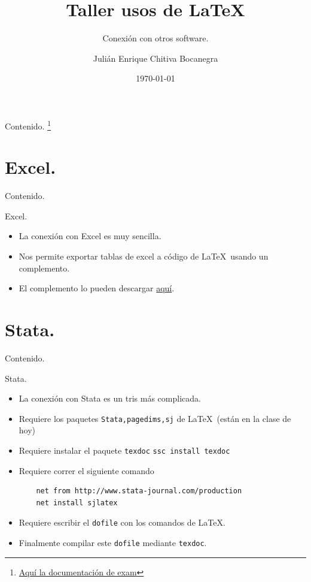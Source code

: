 \documentclass[dvipsnames,xcolor=x11names]{beamer}
\title{Taller usos de \LaTeX}
\subtitle{Conexión con otros software.}
\author[Julián Chitiva Bocanegra]{Julián Enrique Chitiva Bocanegra}
\institute[Uniandes] 
{Universidad de los Andes\\ Facultad de Economía}
\date{\today}
\theoremstyle{plain}
\theoremstyle{definition}
\begin{document}
\begin{frame}
  \titlepage
\end{frame}

\begin{frame}{Contenido.}
  \tableofcontents\footnote{\href{http://www-math.mit.edu/~psh/exam/examdoc.pdf}{Aquí la documentación de exam}}
\end{frame}

\section{Excel.}
\begin{frame}{Contenido.}
  \tableofcontents[currentsection]
\end{frame}
\begin{frame}{Excel.}
\begin{itemize}[<+->]
    \item La conexión con Excel es muy sencilla.
    \item Nos permite exportar tablas de excel a código de \LaTeX\ usando un complemento.
    \item El complemento lo pueden descargar \href{https://ctan.org/pkg/excel2latex?lang=en}{\textcolor{colorClase}{aquí}}.
\end{itemize}
    
\end{frame}
\section{Stata.}
\begin{frame}{Contenido.}
  \tableofcontents[currentsection]
\end{frame}
\begin{frame}[fragile]{Stata.}
    \begin{itemize}[<+->]
        \item La conexión con Stata es un tris más complicada. 
        \item Requiere los paquetes \texttt{Stata,pagedims,sj} de \LaTeX\ (están en la clase de hoy)
        \item Requiere instalar el paquete \texttt{texdoc} \verb!ssc install texdoc!
        \item Requiere correr el siguiente comando 
    \begin{verbatim}
    net from http://www.stata-journal.com/production
    net install sjlatex
    \end{verbatim}
    \item Requiere escribir el \texttt{dofile} con los comandos de \LaTeX.
    \item Finalmente compilar este \texttt{dofile} mediante \texttt{texdoc}.
    \end{itemize}
\end{frame}
\end{document}
